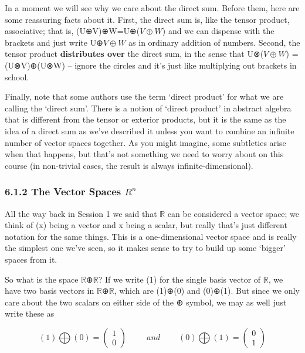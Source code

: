 \documentclass[oneside,english]{amsbook}
\numberwithin{section}{chapter}
\theoremstyle{plain}
\theoremstyle{definition}
\begin{document}
In a moment we will see why we care about the direct sum. Before them,
here are some reassuring facts about it. First, the direct sum is, like
the tensor product, associative; that is, (U⊕V)⊕W=U⊕($V\oplus W$) and we can
dispense with the brackets and just write U⊕$V\oplus W$ as in ordinary addition
of numbers. Second, the tensor product \textbf{distributes over} the
direct sum, in the sense that U⊗($V\oplus W$) = (U⊗V)⊕(U⊗W) -- ignore the
circles and it's just like multiplying out brackets in school.

Finally, note that some authors use the term `direct product' for what
we are calling the `direct sum'. There is a notion of `direct
product' in abstract algebra that is different from the tensor or
exterior products, but it is the same as the idea of a direct sum as
we've described it unless you want to combine an infinite number of
vector spaces together. As you might imagine, some subtleties arise when
that happens, but that's not something we need to worry about on this
course (in non-trivial cases, the result is always
infinite-dimensional).

\subsubsection{\texorpdfstring{6.1.2 The Vector Spaces
		\(R^{n}\)}{6.1.2 The Vector Spaces R\^{}\{n\}}}\label{the-vector-spaces-rn}

All the way back in Session 1 we said that $\mathbb{R}$ can be considered
a vector space; we think of (x) being a vector and x being a scalar, but
really that's just different notation for the same things. This is a
one-dimensional vector space and is really the simplest one we've seen,
so it makes sense to try to build up some `bigger' spaces from it.

So what is the space $\mathbb{R}$⊕$\mathbb{R}$? If we write (1) for the
single basis vector of $\mathbb{R}$, we have two basis vectors in
$\mathbb{R}$⊕$\mathbb{R}$, which are (1)⊕(0) and (0)⊕(1). But since we only
care about the two scalars on either side of the ⊕ symbol, we may as
well just write these as

\[(1)\bigoplus(0) = \begin{pmatrix}
	1 \\
	0
\end{pmatrix}\ \ \ \ \ \ \ \ \ \ \ and\ \ \ \ \ \ \ \ \ \ (0)\bigoplus(1) = \begin{pmatrix}
	0 \\
	1
\end{pmatrix}\]
\end{document}
